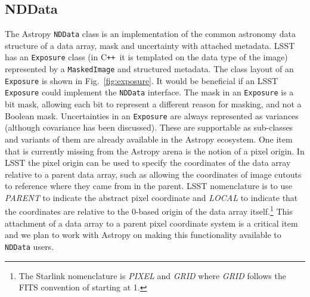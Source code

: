 \documentclass[]{spie}  %
\newcommand{\CPP}{C\texttt{++}\xspace}  %
\begin{document}
\subsection{NDData}

The Astropy \texttt{NDData} class is an implementation of the common astronomy data structure\cite{2015A&C....12..146J} of a data array, mask and uncertainty with attached metadata.
LSST has an \texttt{Exposure} class (in \CPP\ it is templated on the data type of the image) represented by a \texttt{MaskedImage} and structured metadata.
The class layout of an \texttt{Exposure} is shown in Fig.~\ref{fig:exposure}.
It would be beneficial if an LSST \texttt{Exposure} could implement the \texttt{NDData} interface.
The mask in an \texttt{Exposure} is a bit mask, allowing each bit to represent a different reason for masking, and not a Boolean mask.
Uncertainties in an \texttt{Exposure} are always represented as variances (although covariance has been discussed).
These are supportable as sub-classes and variants of them are already available in the Astropy ecosystem.
One item that is currently missing from the Astropy arena is the notion of a pixel origin.
In LSST the pixel origin can be used to specify the coordinates of the data array relative to a parent data array, such as allowing the coordinates of image cutouts to reference where they came from in the parent.
LSST nomenclature is to use \emph{PARENT} to indicate the abstract pixel coordinate and \emph{LOCAL} to indicate that the coordinates are relative to the 0-based origin of the data array itself.\footnote{The Starlink nomenclature\cite{2015A&C....12..146J} is \emph{PIXEL} and \emph{GRID} where \emph{GRID} follows the FITS convention of starting at 1.}
This attachment of a data array to a parent pixel coordinate system is a critical item and we plan to work with Astropy on making this functionality available to \texttt{NDData} users.
\end{document}
